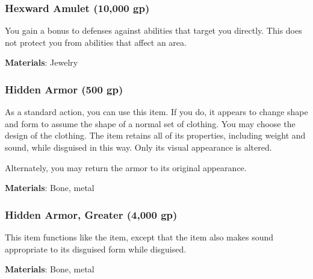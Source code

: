 \lowercase{\hypertarget{item:Hexward Amulet}{}}\label{item:Hexward Amulet}
\hypertarget{item:Hexward Amulet}{\subsubsection{Hexward Amulet\hfill{} (10,000 gp)}}

You gain a  bonus to defenses against  abilities that target you directly.
This does not protect you from abilities that affect an area.



\vspace{0.25em}
\textbf{Materials}: Jewelry


\lowercase{\hypertarget{item:Hidden Armor}{}}\label{item:Hidden Armor}
\hypertarget{item:Hidden Armor}{\subsubsection{Hidden Armor\hfill{} (500 gp)}}

As a standard action, you can use this item.
If you do, it appears to change shape and form to assume the shape of a normal set of clothing.
You may choose the design of the clothing.
The item retains all of its properties, including weight and sound, while disguised in this way.
Only its visual appearance is altered.

Alternately, you may return the armor to its original appearance.



\vspace{0.25em}
\textbf{Materials}: Bone, metal


\lowercase{\hypertarget{item:Hidden Armor, Greater}{}}\label{item:Hidden Armor, Greater}
\hypertarget{item:Hidden Armor, Greater}{\subsubsection{Hidden Armor, Greater\hfill{} (4,000 gp)}}

This item functions like the  item, except that the item also makes sound appropriate to its disguised form while disguised.



\vspace{0.25em}
\textbf{Materials}: Bone, metal


